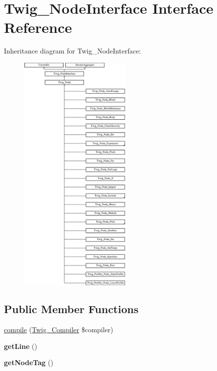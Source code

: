 \hypertarget{interfaceTwig__NodeInterface}{}\section{Twig\+\_\+\+Node\+Interface Interface Reference}
\label{interfaceTwig__NodeInterface}
Inheritance diagram for Twig\+\_\+\+Node\+Interface\+:\begin{figure}[H]
\begin{center}
\leavevmode
\includegraphics[height=12.000000cm]{interfaceTwig__NodeInterface}
\end{center}
\end{figure}
\subsection*{Public Member Functions}
\begin{DoxyCompactItemize}
\item 
\hyperlink{interfaceTwig__NodeInterface_a8d549ab245f11ac9c2d71b8de6f669e6}{compile} (\hyperlink{classTwig__Compiler}{Twig\+\_\+\+Compiler} \$compiler)
\item 
{\bfseries get\+Line} ()\hypertarget{interfaceTwig__NodeInterface_a7ddf1da3fdba4d657ca393f704a44bb0}{}\label{interfaceTwig__NodeInterface_a7ddf1da3fdba4d657ca393f704a44bb0}

\item 
{\bfseries get\+Node\+Tag} ()\hypertarget{interfaceTwig__NodeInterface_a6304606358cf547e88484b5771570d2e}{}\label{interfaceTwig__NodeInterface_a6304606358cf547e88484b5771570d2e}

\end{DoxyCompactItemize}


